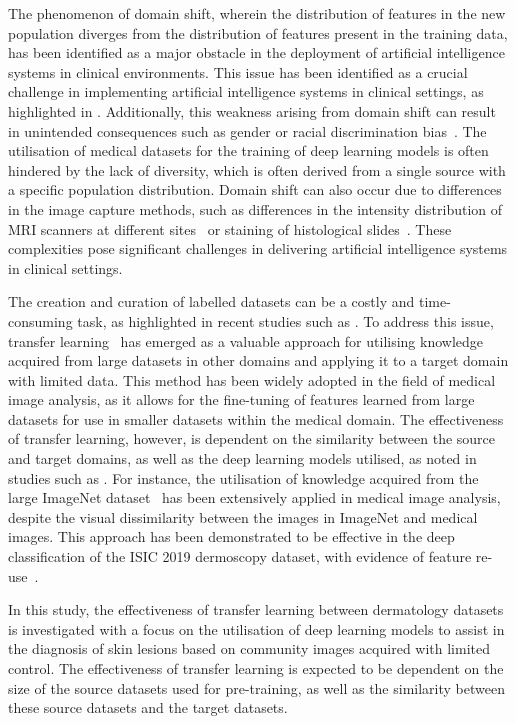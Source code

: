 The phenomenon of domain shift, wherein the distribution of features in the new population diverges from the distribution of features present in the training data, has been identified as a major obstacle in the deployment of artificial intelligence systems in clinical environments. This issue has been identified as a crucial challenge in implementing artificial intelligence systems in clinical settings, as highlighted in \cite{kelly2019key}. Additionally, this weakness arising from domain shift can result in unintended consequences such as gender or racial discrimination bias~\citep{glocker2022risk}. The utilisation of medical datasets for the training of deep learning models is often hindered by the lack of diversity, which is often derived from a single source with a specific population distribution. Domain shift can also occur due to differences in the image capture methods, such as differences in the intensity distribution of MRI scanners at different sites~\citep{prados2017spinal} or staining of histological slides~\citep{stacke2020measuring}. These complexities pose significant challenges in delivering artificial intelligence systems in clinical settings.

The creation and curation of labelled datasets can be a costly and time-consuming task, as highlighted in recent studies such as \cite{chin2022prepare}. To address this issue, transfer learning~\citep{weiss2016survey} has emerged as a valuable approach for utilising knowledge acquired from large datasets in other domains and applying it to a target domain with limited data. This method has been widely adopted in the field of medical image analysis, as it allows for the fine-tuning of features learned from large datasets for use in smaller datasets within the medical domain. The effectiveness of transfer learning, however, is dependent on the similarity between the source and target domains, as well as the deep learning models utilised, as noted in studies such as \cite{matsoukas2022makes}. For instance, the utilisation of knowledge acquired from the large ImageNet dataset~\citep{deng2009imagenet} has been extensively applied in medical image analysis, despite the visual dissimilarity between the images in ImageNet and medical images. This approach has been demonstrated to be effective in the deep classification of the ISIC 2019 dermoscopy dataset, with evidence of feature re-use~\citep{matsoukas2022makes}.

In this study, the effectiveness of transfer learning between dermatology datasets is investigated with a focus on the utilisation of deep learning models to assist in the diagnosis of skin lesions based on community images acquired with limited control. The effectiveness of transfer learning is expected to be dependent on the size of the source datasets used for pre-training, as well as the similarity between these source datasets and the target datasets.

